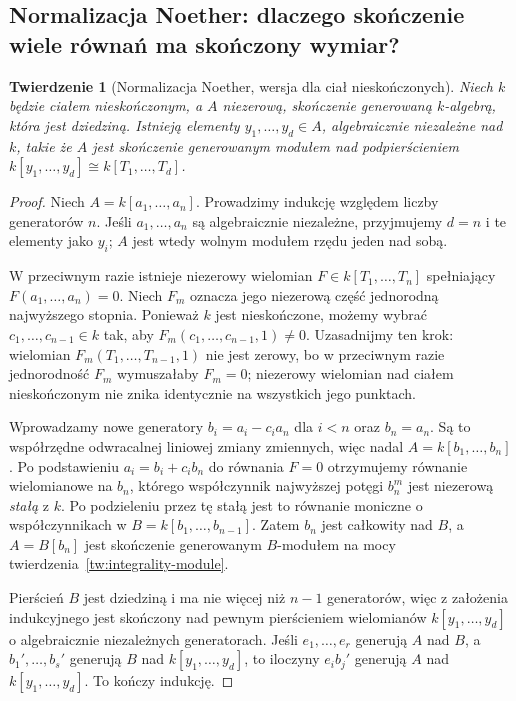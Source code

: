 \documentclass[11pt,a4paper,openany]{report}
\numberwithin{equation}{section}
\theoremstyle{plain}
\newtheorem{twierdzenie}{Twierdzenie}[section]
\theoremstyle{definition}
\theoremstyle{remark}
\begin{document}
\subsection{Normalizacja Noether: dlaczego skończenie wiele równań ma skończony wymiar?}
\begin{twierdzenie}[Normalizacja Noether, wersja dla ciał nieskończonych]
\label{tw:noether-norm}
Niech $k$ będzie ciałem nieskończonym, a $A$
niezerową, skończenie generowaną $k$-algebrą,
która jest dziedziną. Istnieją elementy
$y_1,\ldots,y_d\in A$, algebraicznie niezależne
nad $k$, takie że $A$ jest skończenie generowanym
modułem nad podpierścieniem
$k[y_1,\ldots,y_d]\cong k[T_1,\ldots,T_d]$.
\end{twierdzenie}
\begin{proof}
Niech $A=k[a_1,\ldots,a_n]$. Prowadzimy indukcję
względem liczby generatorów $n$. Jeśli
$a_1,\ldots,a_n$ są algebraicznie niezależne,
przyjmujemy $d=n$ i te elementy jako $y_i$;
$A$ jest wtedy wolnym modułem rzędu jeden nad sobą.

W przeciwnym razie istnieje niezerowy wielomian
$F\in k[T_1,\ldots,T_n]$ spełniający
$F(a_1,\ldots,a_n)=0$. Niech $F_m$ oznacza
jego niezerową część jednorodną najwyższego stopnia.
Ponieważ $k$ jest nieskończone, możemy wybrać
$c_1,\ldots,c_{n-1}\in k$ tak, aby
$F_m(c_1,\ldots,c_{n-1},1)\ne0$.
Uzasadnijmy ten krok: wielomian
$F_m(T_1,\ldots,T_{n-1},1)$ nie jest zerowy,
bo w przeciwnym razie jednorodność $F_m$
wymuszałaby $F_m=0$; niezerowy wielomian
nad ciałem nieskończonym nie znika identycznie
na wszystkich jego punktach.

Wprowadzamy nowe generatory
$b_i=a_i-c_i a_n$ dla $i<n$ oraz $b_n=a_n$.
Są to współrzędne odwracalnej liniowej zmiany
zmiennych, więc nadal $A=k[b_1,\ldots,b_n]$.
Po podstawieniu $a_i=b_i+c_i b_n$ do równania
$F=0$ otrzymujemy równanie wielomianowe
na $b_n$, którego współczynnik najwyższej potęgi
$b_n^m$ jest niezerową \emph{stałą} z $k$.
Po podzieleniu przez tę stałą jest to równanie
moniczne o współczynnikach w
$B=k[b_1,\ldots,b_{n-1}]$. Zatem $b_n$
jest całkowity nad $B$, a $A=B[b_n]$ jest
skończenie generowanym $B$-modułem na mocy
twierdzenia~\ref{tw:integrality-module}.

Pierścień $B$ jest dziedziną i ma nie więcej
niż $n-1$ generatorów, więc z założenia indukcyjnego
jest skończony nad pewnym pierścieniem wielomianów
$k[y_1,\ldots,y_d]$ o algebraicznie niezależnych
generatorach. Jeśli $e_1,\ldots,e_r$ generują
$A$ nad $B$, a $b_1',\ldots,b_s'$ generują $B$
nad $k[y_1,\ldots,y_d]$, to iloczyny $e_i b_j'$
generują $A$ nad $k[y_1,\ldots,y_d]$.
To kończy indukcję.
\end{proof}
\end{document}
